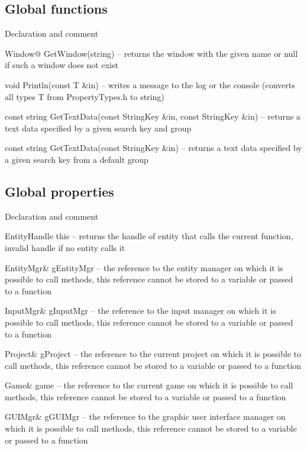 \subsection{Global functions}

\begin{titled-itemize}{Declaration and comment}
  \item Window@ GetWindow(string) -- returns the window with the given name or null if such a window does not exist
  \item void Println(const T \&in) -- writes a message to the log or the console (converts all types T from PropertyTypes.h to string)
  \item const string GetTextData(const StringKey \&in, const StringKey \&in) -- returns a text data specified by a given search key and group
  \item const string GetTextData(const StringKey \&in) -- returns a text data specified by a given search key from a default group
\end{titled-itemize}

\subsection{Global properties}

\begin{titled-itemize}{Declaration and comment}
  \item EntityHandle this -- returns the handle of entity that calls the current function, invalid handle if no entity calls it
  \item EntityMgr\& gEntityMgr -- the reference to the entity manager on which it is possible to call methods, this reference cannot be stored to a variable or passed to a function
  \item InputMgr\& gInputMgr -- the reference to the input manager on which it is possible to call methods, this reference cannot be stored to a variable or passed to a function
  \item Project\& gProject -- the reference to the current project on which it is possible to call methods, this reference cannot be stored to a variable or passed to a function
  \item Game\& game -- the reference to the current game on which it is possible to call methods, this reference cannot be stored to a variable or passed to a function
  \item GUIMgr\& gGUIMgr -- the reference to the graphic user interface manager on which it is possible to call methods, this reference cannot be stored to a variable or passed to a function
\end{titled-itemize}

